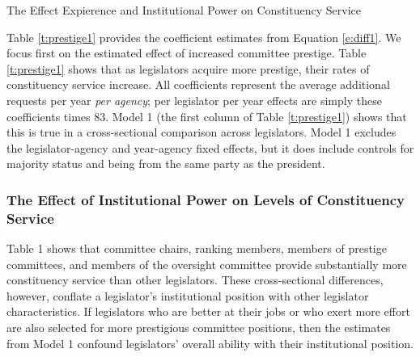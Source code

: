 \documentclass[12pt]{article}
\begin{document}
\begin{table}[hbt!]
\caption{The Effect Expierence and Institutional Power on Constituency Service} \label{t:prestige1}

\begin{minipage}{\textwidth}
\begin{center}

\end{center}
\end{minipage}
\end{table}

Table \ref{t:prestige1} provides the coefficient estimates from Equation \ref{e:diff1}. We focus first on the estimated effect of increased committee prestige. Table \ref{t:prestige1} shows that as legislators acquire more prestige, their rates of constituency service increase. All coefficients represent the average additional requests per year \textit{per agency}; per legislator per year effects are simply these coefficients times 83.  Model 1 (the first column of Table \ref{t:prestige1}) shows that this is true in a cross-sectional comparison across legislators. Model 1 excludes the legislator-agency and year-agency fixed effects, but it does include controls for majority status and being from the same party as the president. 

\subsubsection{The Effect of Institutional Power on Levels of Constituency Service}\label{s:prestigeresults} 

Table 1 shows that committee chairs, ranking members, members of prestige committees, and members of the oversight committee provide substantially more constituency service than other legislators. These cross-sectional differences, however, conflate a legislator's institutional position with other legislator characteristics. If legislators who are better at their jobs or who exert more effort are also selected for more prestigious committee positions, then the estimates from Model 1 confound legislators' overall ability with their institutional position.   
\end{document}
